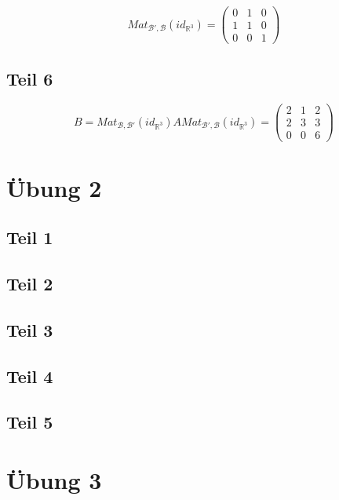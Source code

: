 \documentclass[a4paper,10pt]{article}
\begin{document}
\begin{equation}
 Mat_{\mathcal{B}',\mathcal{B}}(id_{\mathbb{R}^3}) =
  \begin{pmatrix}
   0 & 1 & 0\\
   1 & 1 & 0\\
   0 & 0 & 1
  \end{pmatrix}
\end{equation}

\subsection*{Teil 6}

\begin{equation}
 B = Mat_{\mathcal{B},\mathcal{B}'}(id_{\mathbb{R}^3})AMat_{\mathcal{B}',\mathcal{B}}(id_{\mathbb{R}^3}) = 
  \begin{pmatrix}
   2 & 1 & 2\\
   2 & 3 & 3\\
   0 & 0 & 6
  \end{pmatrix}
\end{equation}

\section*{Übung 2}

\subsection*{Teil 1}

\subsection*{Teil 2}

\subsection*{Teil 3}

\subsection*{Teil 4}

\subsection*{Teil 5}

\section*{Übung 3}
\end{document}
